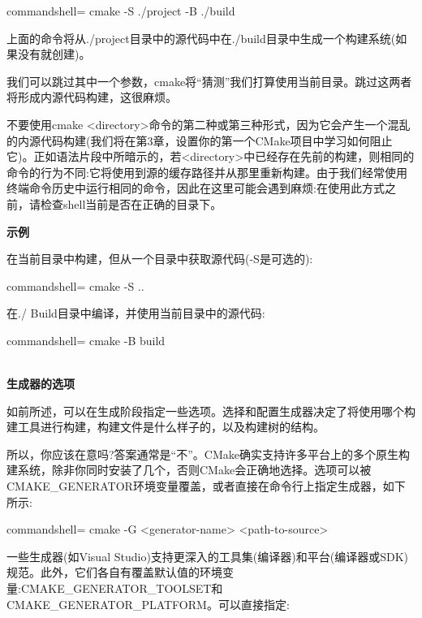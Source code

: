 \begin{tcblisting}{commandshell={}}
cmake -S ./project -B ./build
\end{tcblisting}

上面的命令将从./project目录中的源代码中在./build目录中生成一个构建系统(如果没有就创建)。

我们可以跳过其中一个参数，cmake将“猜测”我们打算使用当前目录。跳过这两者将形成内源代码构建，这很麻烦。

\begin{tcolorbox}[colback=red!5!white,colframe=red!75!black,title=不推荐]
不要使用cmake <directory>命令的第二种或第三种形式，因为它会产生一个混乱的内源代码构建(我们将在第3章，设置你的第一个CMake项目中学习如何阻止它)。正如语法片段中所暗示的，若<directory>中已经存在先前的构建，则相同的命令的行为不同:它将使用到源的缓存路径并从那里重新构建。由于我们经常使用终端命令历史中运行相同的命令，因此在这里可能会遇到麻烦:在使用此方式之前，请检查shell当前是否在正确的目录下。
\end{tcolorbox}

\textbf{示例}

在当前目录中构建，但从一个目录中获取源代码(-S是可选的):

\begin{tcblisting}{commandshell={}}
cmake -S ..
\end{tcblisting}

在./ Build目录中编译，并使用当前目录中的源代码:

\begin{tcblisting}{commandshell={}}
cmake -B build
\end{tcblisting}

\hspace*{\fill} \\ %
\noindent
\textbf{生成器的选项}

如前所述，可以在生成阶段指定一些选项。选择和配置生成器决定了将使用哪个构建工具进行构建，构建文件是什么样子的，以及构建树的结构。
 
所以，你应该在意吗?答案通常是“不”。CMake确实支持许多平台上的多个原生构建系统，除非你同时安装了几个，否则CMake会正确地选择。选项可以被CMAKE\_GENERATOR环境变量覆盖，或者直接在命令行上指定生成器，如下所示:

\begin{tcblisting}{commandshell={}}
cmake -G <generator-name> <path-to-source>
\end{tcblisting}

一些生成器(如Visual Studio)支持更深入的工具集(编译器)和平台(编译器或SDK)规范。此外，它们各自有覆盖默认值的环境变量:CMAKE\_GENERATOR\_TOOLSET和CMAKE\_GENERATOR\_PLATFORM。可以直接指定:

